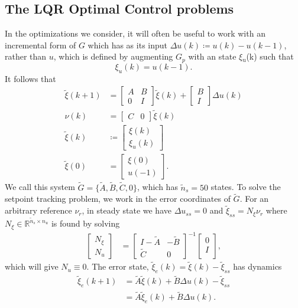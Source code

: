 \documentclass[journal,12pt,onecolumn,draftclsnofoot,,twoside]{IEEEtran/IEEEtran}
\newcommand{\du}{\ensuremath{\Delta u }\xspace}
\newcommand{\Gd}{\ensuremath{\tilde G }\xspace}
\newcommand{\Ad}{\ensuremath{\tilde A }\xspace}
\newcommand{\Bd}{\ensuremath{\tilde B }\xspace}
\newcommand{\Cd}{\ensuremath{\tilde C }\xspace}
\newcommand{\xd}{\ensuremath{\tilde \xi }\xspace}
\newcommand{\x}{\ensuremath{\xi }\xspace}
\newcommand{\xdss}{\ensuremath{\tilde \xi_{ss} }\xspace}
\newcommand{\xde}{\ensuremath{\tilde \xi_{e} }\xspace}
\newcommand{\y}{\ensuremath{\nu} \xspace}
\newcommand{\dd}{\ensuremath{\Delta }\xspace}
\begin{document}
\subsection{The LQR Optimal Control problems}
In the optimizations we consider, it will often be useful to work with an incremental form of \(G\) which has as its input \({\Delta u(k)\coloneqq u(k)-u(k-1)}\), rather than \(u\), which is defined by augmenting \(G_p\) with an state \x\(_{\text{u}}\)(k) such that
\begin{equation*}
  \x_u(k) = u(k-1).
\end{equation*}
It follows that
\begin{subequations}
\begin{align}
  \xd(k+1)
  &=
    \begin{bmatrix}
      A & B\\ 0 & I
    \end{bmatrix}
    \xd(k)
    +
    \begin{bmatrix}
      B\\I
    \end{bmatrix}
  \Delta u(k) \\
  \y(k) & = \begin{bmatrix}C & 0\end{bmatrix}\xd(k)\\
  \xd(k)& \coloneqq \begin{bmatrix}\x(k)\\\x_u(k) \end{bmatrix}\\
  \xd(0) & = \begin{bmatrix}\x(0)\\u(-1)\end{bmatrix}. \label{eqn:x0_aug}
\end{align}\label{eqn:ssdelta}%
\end{subequations}
We call this system \(\Gd = \{\Ad, \Bd, \Cd, 0\}\), which has \({\tilde{n}_s=50}\) states.
To solve the setpoint tracking problem, we work in the error
coordinates of \(\Gd\).
For an arbitrary reference \(\y_r\), in steady state we have \({\du_{ss}=0}\) and \(\xdss =N_{\xi}\y_r\) where \({N_{\xi}\in\mathds{R}^{\tilde{n}_s\times n_u} }\) is found by solving
\begin{align}
  \begin{bmatrix}N_{\xi} \\ N_u\end{bmatrix} &=
\begin{bmatrix}I-\Ad & -\Bd\\\Cd & 0\end{bmatrix}^{-1}\begin{bmatrix}0\\ I\\\end{bmatrix}\label{eqn:nxnu},
\end{align}
which will give \(N_u\equiv 0\).
The error state, \({\xde(k)=\xd(k) - \xdss}\) has dynamics
\begin{align}
  \xde(k+1) & = \Ad\xd(k) + \Bd\dd u(k) - \xdss \nonumber\\
            & = \Ad \xde(k)   + \Bd \dd u(k)\nonumber.
\end{align}
\end{document}
